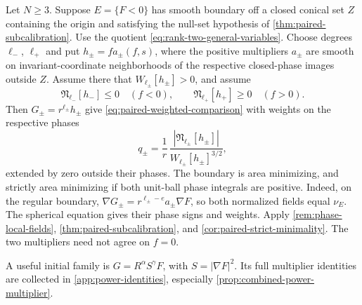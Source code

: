 \begin{remark}
\label{cor:rank-two-paired-potentials}
Let \(N\geq3\).  Suppose \(E=\{F<0\}\) has smooth boundary off a
closed conical set \(Z\) containing the origin and satisfying the
null-set hypothesis of \cref{thm:paired-subcalibration}. Use the quotient
\eqref{eq:rank-two-general-variables}.
Choose degrees \(\ell_-\), \(\ell_+\) and put
\(h_\pm=f a_\pm(f,s)\), where the positive multipliers \(a_\pm\)
are smooth on invariant-coordinate neighborhoods of the respective
closed-phase images outside \(Z\).
Assume there that \(W_{\ell_\pm}[h_\pm]>0\), and assume
\[
 \mathfrak N_{\ell_-}[h_-]\leq0\quad(f<0),\qquad
 \mathfrak N_{\ell_+}[h_+]\geq0\quad(f>0).
\]
Then \(G_\pm=r^{\ell_\pm}h_\pm\) give
\eqref{eq:paired-weighted-comparison} with weights on the respective phases
\[
 q_\pm=\frac1r\,
  \frac{|\mathfrak N_{\ell_\pm}[h_\pm]|}
       {W_{\ell_\pm}[h_\pm]^{3/2}},
\]
extended by zero outside their phases. The boundary is area minimizing,
and strictly area minimizing if both unit-ball phase integrals are positive.
Indeed, on the regular boundary,
\(\nabla G_\pm=r^{\ell_\pm-e}a_\pm\nabla F\), so both normalized
fields equal \(\nu_E\).  The spherical equation gives their phase
signs and weights.  Apply \cref{rem:phase-local-fields},
\cref{thm:paired-subcalibration}, and
\cref{cor:paired-strict-minimality}. The two multipliers need not agree
on \(f=0\).
\end{remark}

A useful initial family is \(G=R^\alpha S^\gamma F\), with
\(S=|\nabla F|^2\).  Its full multiplier identities are collected in
\cref{app:power-identities}, especially
\cref{prop:combined-power-multiplier}.
